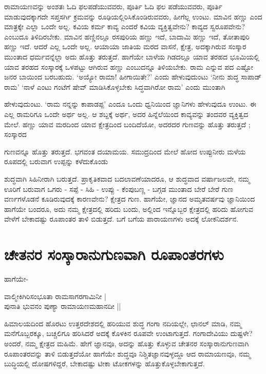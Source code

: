 ರಾಮಾಯಣವನ್ನು ಅಂಶತಃ ಓದಿ ಫಲಪಡೆಯುವವರು, ಪೂರ್ತಿ ಓದಿ ಫಲ ಪಡೆಯುವವರು, ಪೂರ್ತಿ ಮಾಡುವುದಕ್ಕಾಗದೇ ಸಪ್ತಸರ್ಗಿ ಕ್ರಮವನ್ನು ರೂಢಿಯಲ್ಲಿರಿಸಿಕೊಂಡಿರುವವರು, ಹೀಗೆಲ್ಲ ಉಂಟು. ಮಾವಿನ ಹಣ್ಣು ಎಂದ ಮಾತ್ರಕ್ಕೇ ಎಲ್ಲಾ ಒಂದೇ ಅಲ್ಲ. ಕವಿಯ ಕರ್ಮ ಕಾವ್ಯ ಎಂದರೆ ಕವಿಯ ವ್ಯಕ್ತಿತ್ವವೇನು? ಕಾವ್ಯದ ಸ್ವರೂಪವೇನು? ಎಂಬುದೂ ತಿಳಿದಿರಬೇಕು. ಮಾವಿನ ಹಣ್ಣಿನಲ್ಲೂ ರಸಪುರಿಯ ಹಣ್ಣು ಇದೆ, ಬಾದಾಮಿ ಹಣ್ಣು ಇದೆ, ತೋತಾಪುರಿ ಹಣ್ಣು ಇದೆ. ಆದರೆ ಎಲ್ಲ ಒಂದೇ ಅಲ್ಲ. ಆಯಾಯಾ ಜಾತಿಯ ಮರದ ವಾಸನೆ, ಕ್ಷೇತ್ರ, ಅದಕ್ಕಾಗಿರುವ ಸಂಸ್ಕಾರ ಮುಂತಾದ ಧರ್ಮವನ್ನೆಲ್ಲಾ ಅದು ಹೊತ್ತು ತರುತ್ತದೆ. ಹಾಗೆಯೇ ಬಾಳೆಯ ಗಿಡದಲ್ಲೂ ಯಾವ ತರಹದ ಭೂಮಿಯಲ್ಲಿ ಯಾವ ತರಹದ ಸಂಸ್ಕಾರಕ್ಕೆ ಒಳಪಟ್ಟು ಆಗಿರುವ ಹಣ್ಣು ಎಂಬುದನ್ನೂ ತಿಳಿಯಬೇಕು. ರಾಮ ಎನ್ನುವ ಪದ ಎಷ್ಟೋ ಜನರ ಬಾಯಿಂದ ಬರಬಹುದು. `ಅಯ್ಯೋ ರಾಮಾ! ಹೀಗಾಯಿತೇ?' ಎಂದು ಹೇಳುವುದುಂಟು `ನೀನು ಶುದ್ಧ ಸಾಪಾಡ್‍ ರಾಮ' `ನಾಳೆ ಎಂಟು ಗಂಟೆಗೆ ಷೇವ್‍ ಮಾಡಿಸಿಕೊಳ್ಳಬೇಕು ಸಿದ್ಧವಾಗಿರೋ ರಾಮ' ಎಂದು ಮುಂತಾಗಿ 

ಹೇಳುವುದುಂಟು. `ರಾಮ ನನ್ನನ್ನು ಕಾಪಾಡಪ್ಪ' ಎಂದೂ ಒಂದು ಧ್ವನಿಯಿಂದ ಜ್ಞಾನಿಗಳು ಹೇಳುವುದೂ ಉಂಟು. ಈ ಎಲ್ಲ ರಾಮರಿಗೂ ಒಂದೇ ಅರ್ಥ ಅಲ್ಲ. ಆ ಶಬ್ದಕ್ಕೆ ಅರ್ಥ, ಅದರ ಹಿನ್ನೆಲೆಯಿಂದ ಕಾವ್ಯವನ್ನು ತಂದವರ ವ್ಯಕ್ತಿತ್ವದ ಮೇಲೆ. ಹಣ್ಣು ಯಾವ ಮರದಿಂದ ಯಾವ ಕ್ಷೇತ್ರದಿಂದ ಬಂದಿದೆಯೋ, ಅದರದರ ಗುಣವನ್ನು ಹೊತ್ತು ತರುತ್ತದೆ ; ಸಂಸ್ಕಾರದ 

ಗುಣವನ್ನೂ ಹೊತ್ತು ತರುತ್ತದೆ. ಭಗವಂತ ದಯಾಮಯ. ಸಮುದ್ರದಿಂದ ಮೇಲೆ ಹೋದ ಉಪ್ಪುನೀರು ಮಳೆಯ ರೂಪದಲ್ಲಿ ಬರುವಾಗ ಉಪ್ಪನ್ನು ಕಳೆದುಕೊಂಡು 

ಶುದ್ಧವಾಗಿ ಸಿಹಿನೀರಾಗಿ ಬರುತ್ತದೆ. ಪ್ರಾಕೃತಿಕವಾದ ಬದಲಾವಣೆಯಾದರೂ, ಆ ಶುದ್ಧವಾದ ವರ್ಷಾಜಲವೇ, ನಮ್ಮ ಊರಿಗೆ ಬರುವಾಗ ಒಗರು - ಸಪ್ಪೆ - ಸಿಹಿ - ಉಪ್ಪು - ಕೆಂಪುಬಣ್ಣ - ಬಗ್ಗಡ ಮುಂತಾದ ಬೇರೆ ಬೇರೆ ಗುಣ ವರ್ಣಗಳೊಡನೆ ಕೂಡಿರುವುದಕ್ಕೆ ಕಾರಣವೇನು? ಕ್ಷೇತ್ರದ ಗುಣ. ಹಾಗೆಯೇ, ಜ್ಞಾನದ ಅಮೃತವರ್ಷವು ಜ್ಞಾನಿಯಿಂದ ಹಾಗೆಯೇ ಬಂದರೂ, ಅದು ನಮ್ಮ ಕ್ಷೇತ್ರದಲ್ಲಿ ಹರಿದು ಬಂದು, ಅಲ್ಲಿಂದ ಇನ್ನೊಬ್ಬರ ಕ್ಷೇತ್ರದಲ್ಲಿ ಹರಿದು ಹೋಗುವ ವೇಳೆಗೆ ಬೇಕಾದಷ್ಟು ರೂಪಾಂತರ ತಾಳಿ ಬಿಡುತ್ತದೆ. ಬಗೆ ಬಗೆಯ ಪಾರಾಯಣಗಳು ಅದಕ್ಕೆ ಲೋಕನಿದರ್ಶನ. 

\section*{ಚೇತನರ ಸಂಸ್ಕಾರಾನುಗುಣವಾಗಿ ರೂಪಾಂತರಗಳು} 

ಹಾಗೆಯೇ- 


\begin{shloka}
ವಾಲ್ಮೀಕಿಗಿರಿಸಂಭೂತಾ ರಾಮಸಾಗರಗಾಮಿನೀ |\\ 
ಪುನಾತಿ ಭುವನಂ ಪುಣ್ಯಾ ರಾಮಾಯಣಮಹಾನದೀ || 
\end{shloka} 

ಹಿಮಾಲಯದಿಂದ ಹೊರಟು ಉತ್ತರದೇಶದಲ್ಲಿ ಹರಿಯುವ ಶುದ್ಧ ಗಂಗಾ ನದಿಯಲ್ಲೇ, ಛಾನಲ್‍ ಮಾಡಿ, ನಮ್ಮ ಮನೆಗೊಬ್ಬರಕ್ಕೂ, ಬಚ್ಚಲಿಗೂ ಹರಿಸಿದರೆ ಅದಕ್ಕೆ ಕೊಳಕಿನ ರೂಪವೇ ಉಂಟಾಗುತ್ತದೆ. ಗಂಗಾದೇವಿಯು ದುಷ್ಟಳೇ? ಅಂದರೆ, ನಮ್ಮ ಕ್ಷೇತ್ರದ ಮಹಿಮೆ. ಹೇಗೆ ಜ್ಞಾನವೂ, ಅದನ್ನು ಹೊತ್ತು ಕೊಳ್ಳುವ ಚೇತನರ ಸಂಸ್ಕಾರಾನುಗುಣವಾಗಿ ರೂಪಾಂತರವನ್ನು ತಾಳಿ ಬಿಡುತ್ತದೆಯೋ ಹಾಗೆಯೇ ಶುದ್ಧವೂ ನಿಶ್ಚಿತಜ್ಞಾನವುಳ್ಳದ್ದೂ ಆದ ರಾಮಾಯಣವೂ, ನಮ್ಮ ಬುದ್ಧಿಯಲ್ಲಿ ದೋಷಗಳಿದ್ದರೆ, ಬೇಕಾದಷ್ಟು ಟೀಕಾ ಟೋಕಗಳನ್ನು ಹೊತ್ತುಕೊಳ್ಳಬೇಕಾಗುತ್ತದೆ. 

